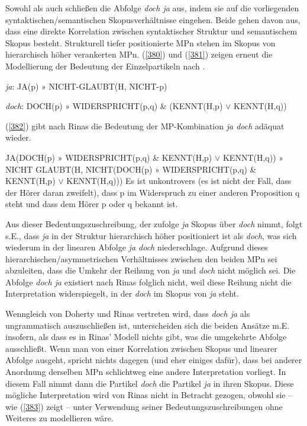 Sowohl \citet{Ormelius-Sandblom1997} als auch \citet{Rinas2006, Rinas2007} schließen die Abfolge \textit{doch ja} aus, indem sie auf die vorliegenden syntaktischen/semantischen Skopusverhältnisse eingehen. Beide gehen davon aus, dass eine direkte Korrelation zwischen syntaktischer Struktur und semantischem Skopus besteht. Strukturell tiefer positionierte MPn stehen im Skopus von hierarchisch höher verankerten MPn. (\ref{380}) und (\ref{381}) zeigen erneut die Modellierung der Bedeutung der Einzelpartikeln nach \citet[420]{Rinas2007}.

\begin{exe}
	\ex\label{380} 
	\textit{ja}: JA(p) $»$ NICHT-GLAUBT(H, NICHT-p)
\end{exe}
\vspace{-0.65cm}
\begin{exe}
	\ex\label{381} 	
	\textit{doch}: DOCH(p) $»$ WIDERSPRICHT(p,q) \& (KENNT(H,p) $\lor$ KENNT(H,q))
	\newline
	\hbox{}\hfill\hbox{\citet[425/420]{Rinas2007}}	
\end{exe}
(\ref{382}) gibt nach Rinas die Bedeutung der MP-Kombination \textit{ja doch} adäquat wieder.
\begin{exe}
	\ex\label{382} 
		\begin{xlist}	
			\ex\label{382a} JA(DOCH(p) $»$ WIDERSPRICHT(p,q) \& KENNT(H,p) $\lor$ KENNT(H,q))
				$»$ NICHT GLAUBT(H, NICHT(DOCH(p) $»$ WIDERSPRICHT(p,q) \& \\ KENNT(H,p) $\lor$ KENNT(H,q)))
			\ex\label{382b} \glq Es ist unkontrovers (es ist nicht der Fall, dass der Hörer daran zweifelt), dass p im 							Widerspruch zu einer anderen Proposition q steht und dass dem Hörer p oder q bekannt ist.\grq {}
			\hfill\hbox {\citet[431]{Rinas2007}}
		\end{xlist}
\end{exe}
Aus dieser Bedeutungszuschreibung, der zufolge \textit{ja} Skopus über \textit{doch} nimmt, folgt s.E., dass \textit{ja} in der Struktur hierarchisch höher positioniert ist als \textit{doch}, was sich wiederum in der linearen Abfolge \textit{ja doch} niederschlage. Aufgrund dieses hierarchischen/asymmetrischen Verhältnisses zwischen den beiden MPn sei abzuleiten, dass die Umkehr der Reihung von \textit{ja} und \textit{doch} nicht möglich sei. Die Abfolge \textit{doch ja} existiert nach Rinas folglich nicht, weil diese Reihung nicht die Interpretation widerspiegelt, in der \textit{doch} im Skopus von \textit{ja} steht.

Wenngleich von Doherty und Rinas vertreten wird, dass \textit{doch ja} als ungrammatisch auszuschließen ist, unterscheiden sich die beiden Ansätze m.E. insofern, als dass es in Rinas' Modell nichts gibt, was die umgekehrte Abfolge ausschließt. Wenn man von einer Korrelation zwischen Skopus und linearer Abfolge ausgeht, spricht nichts dagegen (und eher einiges dafür), dass bei anderer Anordnung derselben MPn schlichtweg eine andere Interpretation vorliegt. In diesem Fall nimmt dann die Partikel \textit{doch} die Partikel \textit{ja} in ihren Skopus. Diese mögliche Interpretation wird von Rinas nicht in Betracht gezogen, obwohl sie – wie (\ref{383}) zeigt – unter Verwendung seiner Bedeutungszuschreibungen ohne Weiteres zu modellieren wäre.

